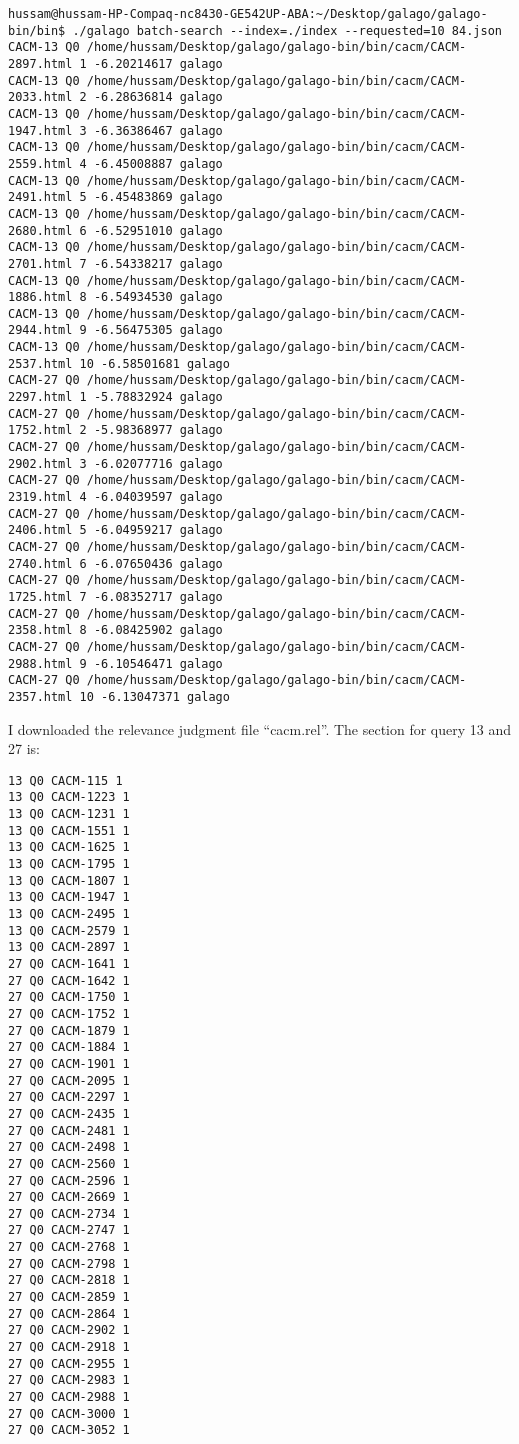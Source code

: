 \begin{lstlisting}[breakatwhitespace=〈false)]
hussam@hussam-HP-Compaq-nc8430-GE542UP-ABA:~/Desktop/galago/galago-bin/bin$ ./galago batch-search --index=./index --requested=10 84.json
CACM-13 Q0 /home/hussam/Desktop/galago/galago-bin/bin/cacm/CACM-2897.html 1 -6.20214617 galago
CACM-13 Q0 /home/hussam/Desktop/galago/galago-bin/bin/cacm/CACM-2033.html 2 -6.28636814 galago
CACM-13 Q0 /home/hussam/Desktop/galago/galago-bin/bin/cacm/CACM-1947.html 3 -6.36386467 galago
CACM-13 Q0 /home/hussam/Desktop/galago/galago-bin/bin/cacm/CACM-2559.html 4 -6.45008887 galago
CACM-13 Q0 /home/hussam/Desktop/galago/galago-bin/bin/cacm/CACM-2491.html 5 -6.45483869 galago
CACM-13 Q0 /home/hussam/Desktop/galago/galago-bin/bin/cacm/CACM-2680.html 6 -6.52951010 galago
CACM-13 Q0 /home/hussam/Desktop/galago/galago-bin/bin/cacm/CACM-2701.html 7 -6.54338217 galago
CACM-13 Q0 /home/hussam/Desktop/galago/galago-bin/bin/cacm/CACM-1886.html 8 -6.54934530 galago
CACM-13 Q0 /home/hussam/Desktop/galago/galago-bin/bin/cacm/CACM-2944.html 9 -6.56475305 galago
CACM-13 Q0 /home/hussam/Desktop/galago/galago-bin/bin/cacm/CACM-2537.html 10 -6.58501681 galago
CACM-27 Q0 /home/hussam/Desktop/galago/galago-bin/bin/cacm/CACM-2297.html 1 -5.78832924 galago
CACM-27 Q0 /home/hussam/Desktop/galago/galago-bin/bin/cacm/CACM-1752.html 2 -5.98368977 galago
CACM-27 Q0 /home/hussam/Desktop/galago/galago-bin/bin/cacm/CACM-2902.html 3 -6.02077716 galago
CACM-27 Q0 /home/hussam/Desktop/galago/galago-bin/bin/cacm/CACM-2319.html 4 -6.04039597 galago
CACM-27 Q0 /home/hussam/Desktop/galago/galago-bin/bin/cacm/CACM-2406.html 5 -6.04959217 galago
CACM-27 Q0 /home/hussam/Desktop/galago/galago-bin/bin/cacm/CACM-2740.html 6 -6.07650436 galago
CACM-27 Q0 /home/hussam/Desktop/galago/galago-bin/bin/cacm/CACM-1725.html 7 -6.08352717 galago
CACM-27 Q0 /home/hussam/Desktop/galago/galago-bin/bin/cacm/CACM-2358.html 8 -6.08425902 galago
CACM-27 Q0 /home/hussam/Desktop/galago/galago-bin/bin/cacm/CACM-2988.html 9 -6.10546471 galago
CACM-27 Q0 /home/hussam/Desktop/galago/galago-bin/bin/cacm/CACM-2357.html 10 -6.13047371 galago
\end{lstlisting}

I downloaded the relevance judgment file ``cacm.rel''. The section for query 13 and 27 is:

\begin{lstlisting}[breakatwhitespace=〈false)]
13 Q0 CACM-115 1
13 Q0 CACM-1223 1
13 Q0 CACM-1231 1
13 Q0 CACM-1551 1
13 Q0 CACM-1625 1
13 Q0 CACM-1795 1
13 Q0 CACM-1807 1
13 Q0 CACM-1947 1
13 Q0 CACM-2495 1
13 Q0 CACM-2579 1
13 Q0 CACM-2897 1
27 Q0 CACM-1641 1
27 Q0 CACM-1642 1
27 Q0 CACM-1750 1
27 Q0 CACM-1752 1
27 Q0 CACM-1879 1
27 Q0 CACM-1884 1
27 Q0 CACM-1901 1
27 Q0 CACM-2095 1
27 Q0 CACM-2297 1
27 Q0 CACM-2435 1
27 Q0 CACM-2481 1
27 Q0 CACM-2498 1
27 Q0 CACM-2560 1
27 Q0 CACM-2596 1
27 Q0 CACM-2669 1
27 Q0 CACM-2734 1
27 Q0 CACM-2747 1
27 Q0 CACM-2768 1
27 Q0 CACM-2798 1
27 Q0 CACM-2818 1
27 Q0 CACM-2859 1
27 Q0 CACM-2864 1
27 Q0 CACM-2902 1
27 Q0 CACM-2918 1
27 Q0 CACM-2955 1
27 Q0 CACM-2983 1
27 Q0 CACM-2988 1
27 Q0 CACM-3000 1
27 Q0 CACM-3052 1
\end{lstlisting}

